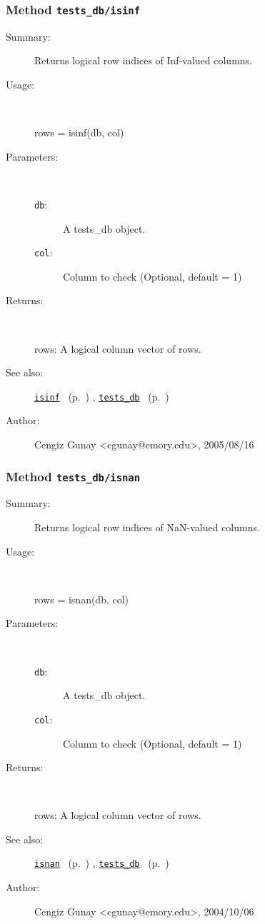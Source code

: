 \subsubsection[Method \texttt{isinf}]{Method \texttt{tests\_db/isinf}}%
%
\label{ref_tests_db__isinf}%
\hypertarget{ref_tests_db__isinf}{}%
\begin{description}
\item[Summary:]Returns logical row indices of Inf-valued columns.
%
\item[Usage:]~%
\begin{lyxcode}%
rows = isinf(db, col)
%
\end{lyxcode}%
%
%
\item[Parameters:]~
\begin{description}%
\item[\texttt{db}:]
 A tests\_db object.
\item[\texttt{col}:]
 Column to check (Optional, default = 1)
\end{description}%
%
\item[Returns:]~

	rows: A logical column vector of rows.
%
%
\item[See also:]%
\hyperlink{ref_isinf}{\texttt{isinf}}%
\ (p.~\pageref{ref_isinf})%
%
, \hyperlink{ref_tests_db}{\texttt{tests\_db}}%
\ (p.~\pageref{ref_tests_db})%
%
%
\item[Author:]%
Cengiz Gunay <cgunay@emory.edu>, 2005/08/16%
\end{description}
\methodline%
\subsubsection[Method \texttt{isnan}]{Method \texttt{tests\_db/isnan}}%
%
\label{ref_tests_db__isnan}%
\hypertarget{ref_tests_db__isnan}{}%
\begin{description}
\item[Summary:]Returns logical row indices of NaN-valued columns.
%
\item[Usage:]~%
\begin{lyxcode}%
rows = isnan(db, col)
%
\end{lyxcode}%
%
%
\item[Parameters:]~
\begin{description}%
\item[\texttt{db}:]
 A tests\_db object.
\item[\texttt{col}:]
 Column to check (Optional, default = 1)
\end{description}%
%
\item[Returns:]~

	rows: A logical column vector of rows.
%
%
\item[See also:]%
\hyperlink{ref_isnan}{\texttt{isnan}}%
\ (p.~\pageref{ref_isnan})%
%
, \hyperlink{ref_tests_db}{\texttt{tests\_db}}%
\ (p.~\pageref{ref_tests_db})%
%
%
\item[Author:]%
Cengiz Gunay <cgunay@emory.edu>, 2004/10/06%
\end{description}
\methodline%

